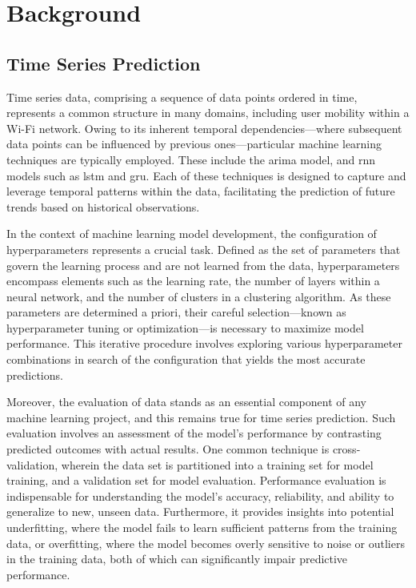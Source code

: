 \chapter{Background}\label{sec:background}

\section{Time Series Prediction}
Time series data, comprising a sequence of data points ordered in time, represents a common structure in many domains, including user mobility within a Wi-Fi network.
Owing to its inherent temporal dependencies—where subsequent data points can be influenced by previous ones—particular machine learning techniques are typically employed.
These include the \ac{arima} model, and \ac{rnn} models such as \ac{lstm} and \ac{gru}.
Each of these techniques is designed to capture and leverage temporal patterns within the data, facilitating the prediction of future trends based on historical observations.

In the context of machine learning model development, the configuration of hyperparameters represents a crucial task.
Defined as the set of parameters that govern the learning process and are not learned from the data, hyperparameters encompass elements such as the learning rate, the number of layers within a neural network, and the number of clusters in a clustering algorithm.
As these parameters are determined a priori, their careful selection—known as hyperparameter tuning or optimization—is necessary to maximize model performance.
This iterative procedure involves exploring various hyperparameter combinations in search of the configuration that yields the most accurate predictions.

Moreover, the evaluation of data stands as an essential component of any machine learning project, and this remains true for time series prediction.
Such evaluation involves an assessment of the model's performance by contrasting predicted outcomes with actual results.
One common technique is cross-validation, wherein the data set is partitioned into a training set for model training, and a validation set for model evaluation.
Performance evaluation is indispensable for understanding the model's accuracy, reliability, and ability to generalize to new, unseen data.
Furthermore, it provides insights into potential underfitting, where the model fails to learn sufficient patterns from the training data, or overfitting, where the model becomes overly sensitive to noise or outliers in the training data, both of which can significantly impair predictive performance.

